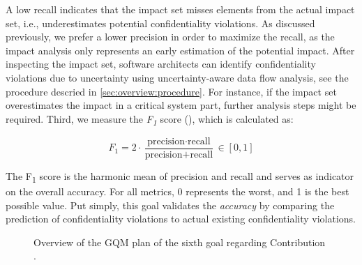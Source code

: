 A low recall indicates that the impact set misses elements from the actual impact set, i.e., underestimates potential confidentiality violations.
As discussed previously, we prefer a lower precision in order to maximize the recall, as the impact analysis only represents an early estimation of the potential impact.
After inspecting the impact set, software architects can identify confidentiality violations due to uncertainty using uncertainty-aware data flow analysis, see the procedure descried in \autoref{sec:overview:procedure}.
For instance, if the impact set overestimates the impact in a critical system part, further analysis steps might be required.
Third, we measure the \emph{F\textsubscript{1}} score (\label{gqm:text:m:5:1:3}), which is calculated as:

\begin{equation*}
  F_{1} = 2 \cdot \frac{\text{precision} \cdot \text{recall}}{\text{precision} + \text{recall}} \in [0,1]
\end{equation*}

The F\textsubscript{1} score is the harmonic mean of precision and recall and serves as indicator on the overall accuracy.
For all metrics, 0 represents the worst, and 1 is the best possible value.
Put simply, this goal validates the \emph{accuracy} by comparing the prediction of confidentiality violations to actual existing confidentiality violations.


\newcommand{\textGvi}[0]{Validate the \emph{effort reduction} of the uncertainty impact analysis, i.e., how many \acs{DFD} nodes have to be manually considered by software architects.}
\newcommand{\textGviQi}[0]{How large is the \emph{effort reduction} compared to manual analysis?}
\newcommand{\textGviQiMi}[0]{Ratio of the actual impact set, $ratio_{actual} = \frac{TP + FN}{n} \in [0,1]$}
\newcommand{\textGviQiMii}[0]{Ratio of the uncertainty impact set, $ratio_{impact} = \frac{TP + FP}{n} \in [0,1]$}
\begin{figure}
    \centering
    \caption{Overview of the \ac*{GQM} plan of the sixth goal regarding Contribution .}
    \label{gqm:plan:g6}
\end{figure}

